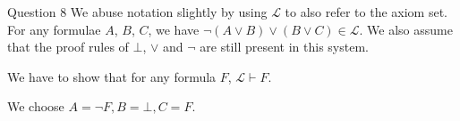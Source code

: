 \documentclass{beamer}
\begin{document}
{        %

        \begin{frame}{Question 8}
            We abuse notation slightly by using $\mathcal{L}$ to also refer to the axiom set. For any formulae $A$, $B$, $C$, we have $\neg \left(A \lor B\right) \lor (B \lor C) \in \mathcal{L}$. We also assume that the proof rules of $\bot$, $\lor$ and $\neg$ are still present in this system.

            We have to show that for any formula $F$, $\mathcal{L} \vdash F$.

            We choose $A = \neg F, B = \bot, C = F$.


\end{frame}}
\end{document}
